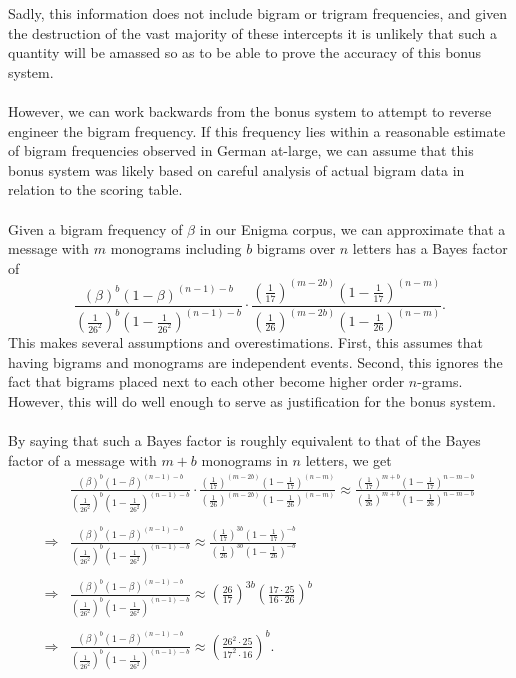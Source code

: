   Sadly, this information does not include bigram or trigram
  frequencies, and given the destruction of the vast majority of
  these intercepts it
  is unlikely that such a quantity will be amassed so as to be able
  to prove the accuracy of this bonus system.
  \\\\However, we can work backwards from the bonus system to attempt
  to reverse engineer the bigram frequency. If this frequency lies
  within a reasonable estimate of bigram frequencies observed in
  German at-large, we can assume that this bonus system was likely
  based on careful analysis of actual bigram data in relation to the
  scoring table.
  \\\\Given a bigram frequency of $\beta$ in our Enigma corpus, we
  can approximate that a message with $m$ monograms including $b$
  bigrams over $n$ letters has a Bayes factor of
  \[
    \frac{(\beta)^b(1-\beta)^{(n-1)-b}}{(\frac{1}{26^2})^b(1-\frac{1}{26^2})^{(n-1)-b}}\cdot\frac{(\frac{1}{17})^{(m-2b)}(1-\frac{1}{17})^{(n-m)}}{(\frac{1}{26})^{(m-2b)}(1-\frac{1}{26})^{(n-m)}}.
  \]
  This makes several assumptions and overestimations. First, this
  assumes that having bigrams and monograms are independent events.
  Second, this ignores the fact that bigrams placed next to each
  other become higher order $n$-grams. However, this will do well
  enough to serve as justification for the bonus system.
  \\\\By saying that such a Bayes factor is roughly equivalent to
  that of the Bayes factor of a message with $m+b$ monograms in $n$
  letters, we get
  \begin{align*}
    &
    \frac{(\beta)^b(1-\beta)^{(n-1)-b}}{(\frac{1}{26^2})^b(1-\frac{1}{26^2})^{(n-1)-b}}\cdot\frac{(\frac{1}{17})^{(m-2b)}(1-\frac{1}{17})^{(n-m)}}{(\frac{1}{26})^{(m-2b)}(1-\frac{1}{26})^{(n-m)}}
    \approx
    \frac{(\frac{1}{17})^{m+b}(1-\frac{1}{17})^{n-m-b}}{(\frac{1}{26})^{m+b}(1-\frac{1}{26})^{n-m-b}}
    \\\\
    \Rightarrow &
    \frac{(\beta)^b(1-\beta)^{(n-1)-b}}{(\frac{1}{26^2})^b(1-\frac{1}{26^2})^{(n-1)-b}}\approx
    \frac{(\frac{1}{17})^{3b}(1-\frac{1}{17})^{-b}}{(\frac{1}{26})^{3b}(1-\frac{1}{26})^{-b}}
    \\\\
    \Rightarrow &
    \frac{(\beta)^b(1-\beta)^{(n-1)-b}}{(\frac{1}{26^2})^b(1-\frac{1}{26^2})^{(n-1)-b}}\approx
    (\frac{26}{17})^{3b}(\frac{17\cdot25}{16\cdot26})^b
    \\\\
    \Rightarrow &
    \frac{(\beta)^b(1-\beta)^{(n-1)-b}}{(\frac{1}{26^2})^b(1-\frac{1}{26^2})^{(n-1)-b}}\approx
    (\frac{26^2\cdot25}{17^2\cdot16})^b.
  \end{align*}

